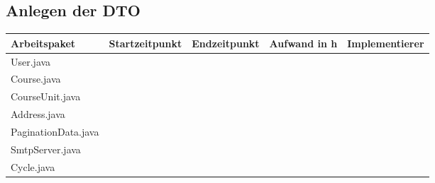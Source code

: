 \begin{landscape}
\subsection{Anlegen der DTO}
\begin{tabular}{|p{10cm}|p{4cm}|p{3cm}|p{3cm}|p{3cm}|}
	\hline  \textbf{Arbeitspaket} & \textbf{Startzeitpunkt} & \textbf{Endzeitpunkt} & \textbf{Aufwand in h} & \textbf{Implementierer} \\ 
	\hline   User.java                        &                            &                             &                     &\\ 
	\hline   Course.java                      &                            &                             &                     &\\ 
	\hline   CourseUnit.java                  &                            &                             &                     &\\ 
	\hline   Address.java                     &                            &                             &                     &\\ 
	\hline   PaginationData.java              &                            &                             &                     &\\ 
	\hline   SmtpServer.java                  &                            &                             &                     &\\  
	\hline   Cycle.java                       &                            &                             &                     &\\   
	\hline 
\end{tabular} \ \\
\ \\


\end{landscape}
